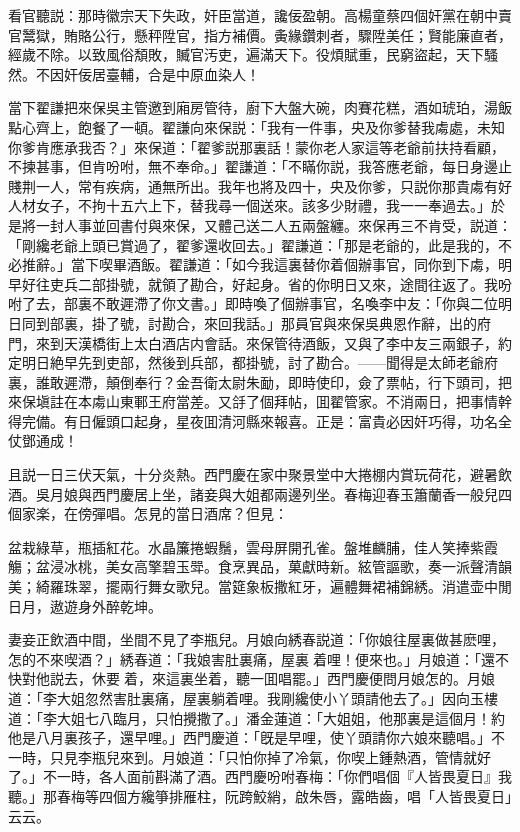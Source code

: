 看官聽説：那時徽宗天下失政，奸臣當道，讒佞盈朝。高楊童蔡四個奸黨在朝中賣官鬵獄，賄賂公行，懸秤陞官，指方補價。夤緣鑽刺者，驟陞美任；賢能廉直者，經歲不除。以致風俗頽敗，贓官汚吏，遍滿天下。役煩賦重，民窮盜起，天下騷然。不因奸佞居臺輔，合是中原血染人！

當下翟謙把來保吳主管邀到廂房管待，廚下大盤大碗，肉賽花糕，酒如琥珀，湯飯點心齊上，飽餐了一頓。翟謙向來保説：「我有一件事，央及你爹替我䖏處，未知你爹肯應承我否？」來保道：「翟爹説那裏話！蒙你老人家這等老爺前扶持看顧，不揀甚事，但肯吩咐，無不奉命。」翟謙道：「不瞞你説，我答應老爺，每日身邊止賤荆一人，常有疾病，通無所出。我年也將及四十，央及你爹，只説你那貴䖏有好人材女子，不拘十五六上下，替我尋一個送來。該多少財禮，我一一奉過去。」於是將一封人事並回書付與來保，又體己送二人五兩盤纏。來保再三不肯受，説道：「剛纔老爺上頭已賞過了，翟爹還收回去。」翟謙道：「那是老爺的，此是我的，不必推辭。」當下喫畢酒飯。翟謙道：「如今我這裏替你着個辦事官，同你到下䖏，明早好往吏兵二部掛號，就領了勘合，好起身。省的你明日又來，途間往返了。我吩咐了去，部裏不敢遲滯了你文書。」即時喚了個辦事官，名喚李中友：「你與二位明日同到部裏，掛了號，討勘合，來回我話。」那員官與來保吳典恩作辭，出的府門，來到天漢橋街上太白酒店内會話。來保管待酒飯，又與了李中友三兩銀子，約定明日絶早先到吏部，然後到兵部，都掛號，討了勘合。——聞得是太師老爺府裏，誰敢遲滯，顛倒奉行？金吾衛太尉朱勔，即時使印，僉了票帖，行下頭司，把來保塡註在本䖏山東鄆王府當差。又㧱了個拜帖，囬翟管家。不消兩日，把事情幹得完備。有日僱頭口起身，星夜囬清河縣來報喜。正是：富貴必因奸巧得，功名全仗鄧通成！

且説一日三伏天氣，十分炎熱。西門慶在家中聚景堂中大捲棚内賞玩荷花，避暑飲酒。吳月娘與西門慶居上坐，諸妾與大姐都兩邊列坐。春梅迎春玉簫蘭香一般兒四個家楽，在傍彈唱。怎見的當日酒席？但見：

\begin{myquote}
盆栽綠草，瓶插紅花。水晶簾捲蝦鬚，雲母屏開孔雀。盤堆麟脯，佳人笑捧紫霞觴；盆浸冰桃，美女高擎碧玉斝。食烹異品，菓獻時新。絃管謳歌，奏一派聲清韻美；綺羅珠翠，擺兩行舞女歌兒。當筵象板撒紅牙，遍體舞裙補錦綉。消遣壶中閒日月，遨遊身外醉乾坤。
\end{myquote}

妻妾正飲酒中間，坐間不見了李瓶兒。月娘向綉春説道：「你娘往屋裏做甚麽哩，怎的不來喫酒？」綉春道：「我娘害肚裏痛，屋裏𢱉着哩！便來也。」月娘道：「還不快對他説去，休要𢱉着，來這裏坐着，聽一囬唱罷。」西門慶便問月娘怎的。月娘道：「李大姐忽然害肚裏痛，屋裏躺着哩。我剛纔使小丫頭請他去了。」因向玉樓道：「李大姐七八臨月，只怕攪撒了。」潘金蓮道：「大姐姐，他那裏是這個月！約他是八月裏孩子，還早哩。」西門慶道：「旣是早哩，使丫頭請你六娘來聽唱。」不一時，只見李瓶兒來到。月娘道：「只怕你掉了冷氣，你喫上鍾熱酒，管情就好了。」不一時，各人面前斟滿了酒。西門慶吩咐春梅：「你們唱個『人皆畏夏日』我聽。」那春梅等四個方纔箏排雁柱，阮跨鮫綃，啟朱唇，露皓齒，唱「人皆畏夏日」云云。

